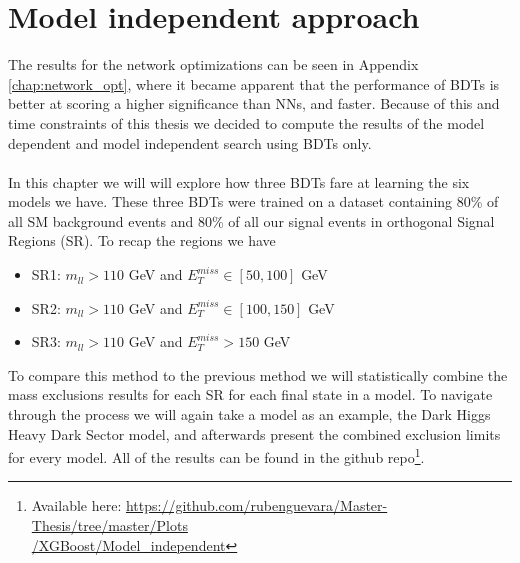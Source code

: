 \documentclass[12pt, a4paper]{book}
\begin{document}
\label{chap:Best_ML_MI}
\chapter{Model independent approach}
The results for the network optimizations can be seen in Appendix \ref{chap:network_opt}, where it became apparent that the performance of BDTs is better at scoring a higher significance than NNs, and faster. Because of this and time constraints of this thesis 
we decided to compute the results of the model dependent and model independent search using BDTs only. \\\\
In this chapter we will will explore how three BDTs fare at learning the six models we have. These three BDTs were trained on a dataset containing 80\% of all SM background events and 80\% of all our signal events in orthogonal Signal Regions (SR). To recap the regions we have
\begin{itemize}
   \item SR1: $m_{ll} >110$ GeV and $E_T^{miss} \in [50, 100]$ GeV
   \item SR2: $m_{ll} >110$ GeV and $E_T^{miss} \in [100, 150]$ GeV
   \item SR3: $m_{ll} >110$ GeV and $E_T^{miss} >150$ GeV
\end{itemize}
To compare this method to the previous method we will statistically combine the mass exclusions results for each SR for each final state in a model. To navigate through the process we will again take a model as an example, the Dark Higgs Heavy Dark Sector model, 
and afterwards present the combined exclusion limits for every model. All of the results can be found in the github repo\footnote{Available here: \href{https://github.com/rubenguevara/Master-Thesis/tree/master/Plots/XGBoost/Model_independent}{https://github.com/rubenguevara/Master-Thesis/tree/master/Plots\\/XGBoost/Model\_independent}}. 

\clearpage
\graphicspath{{../../../Plots/}}
\end{document}
